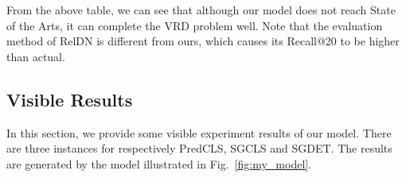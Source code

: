 From the above table, we can see that although our model does not reach State of the Arts, it can complete the VRD problem well. Note that the evaluation method of RelDN is different from ours, which causes its Recall@20 to be higher than actual.

\subsection{Visible Results}
In this section, we provide some visible experiment results of our model. There are three instances for respectively PredCLS, SGCLS and SGDET. The results are generated by the model illustrated in Fig.~\ref{fig:my_model}.

\begin{figure}[h!]
	\centering
\end{figure}

